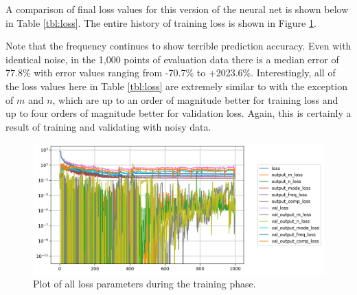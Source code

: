 \documentclass[conference]{IEEEtran}
\begin{document}
A comparison of final loss values for this version of the neural net is shown below in Table \ref{tbl:loss}. 
The entire history of training loss is shown in Figure \ref{fig:training_loss_plot}.

\begin{table}
	\centering
	\caption{Comparison of training and validation loss after fitting model.}
	\setlength\extrarowheight{2pt}
	\label{tbl:loss}
\end{table}

Note that the frequency continues to show terrible prediction accuracy. 
Even with identical noise, in the 1,000 points of evaluation data there is a median error of 77.8\% with error values ranging from -70.7\% to +2023.6\%.
Interestingly, all of the loss values here in Table \ref{tbl:loss} are extremely similar to \cite{newberry_machine_2022-1} with the exception of $m$ and $n$, which are up to an order of magnitude better for training loss and up to four orders of magnitude better for validation loss.
Again, this is certainly a result of training and validating with noisy data.

\begin{figure}
	\centering
	\includegraphics[width=1\linewidth]{images/nn_training_loss}
	\caption{Plot of all loss parameters during the training phase.}
	\label{fig:training_loss_plot}
\end{figure}
\end{document}
